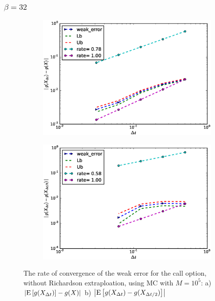 \documentclass[11pt]{article}
\newcommand{\expt}[1]{\mathrm{E}\left[#1\right]}
\begin{document}
\newpage
\subsubsection*{$\beta=32$}

\begin{figure}[h!]
	\centering
	\begin{subfigure}{.4\textwidth}
		\centering
		\includegraphics[width=1\linewidth]{./figures/weak_error_rates_call/Beta_32/without_rich/weak_convergence_order_call_option_relative_M_10_5}
		\caption{}
		\label{fig:sub3}
	\end{subfigure}%
	\begin{subfigure}{.4\textwidth}
		\centering
		\includegraphics[width=1\linewidth]{./figures/weak_error_rates_call/Beta_32/without_rich/weak_convergence_order_differences_call_option_relative_M_10_5}
		\caption{}
		\label{fig:sub4}
	\end{subfigure}
	
	\caption{The rate of convergence of the weak error for the call option, without Richardson extraploation, using MC with $M=10^5$: a) $\abs{\expt{g(X_{\Delta t})}-g(X)}$  b) $\abs{\expt{g(X_{\Delta t})-g(X_{\Delta t/2})}}$ }
	\label{fig:Weak_rate_call_without_rich_beta_32}
\end{figure}
\end{document}
